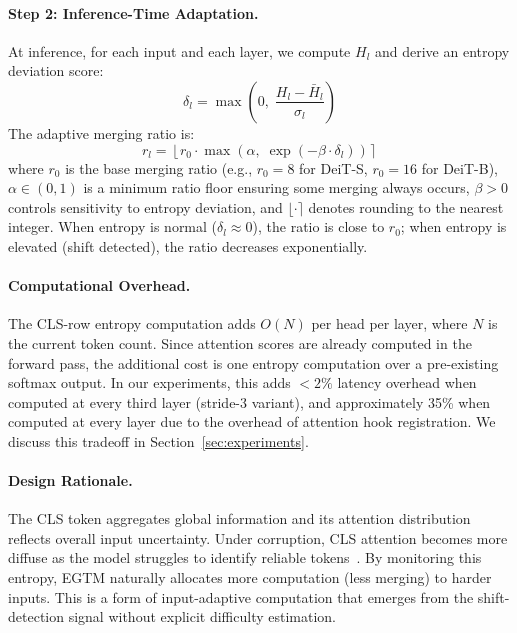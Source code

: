 \documentclass{article}
\newcommand{\ours}{EGTM}
\begin{document}
\paragraph{Step 2: Inference-Time Adaptation.}
At inference, for each input and each layer, we compute $H_l$ and derive an entropy deviation score:
\begin{equation}
\delta_l = \max\!\left(0,\; \frac{H_l - \bar{H}_l}{\sigma_l}\right)
\end{equation}
The adaptive merging ratio is:
\begin{equation}
r_l = \left\lfloor r_0 \cdot \max\!\left(\alpha,\; \exp(-\beta \cdot \delta_l)\right) \right\rceil
\label{eq:adaptive_ratio}
\end{equation}
where $r_0$ is the base merging ratio (e.g., $r_0{=}8$ for DeiT-S, $r_0{=}16$ for DeiT-B), $\alpha \in (0,1)$ is a minimum ratio floor ensuring some merging always occurs, $\beta > 0$ controls sensitivity to entropy deviation, and $\lfloor \cdot \rceil$ denotes rounding to the nearest integer. When entropy is normal ($\delta_l \approx 0$), the ratio is close to $r_0$; when entropy is elevated (shift detected), the ratio decreases exponentially.

\paragraph{Computational Overhead.}
The CLS-row entropy computation adds $O(N)$ per head per layer, where $N$ is the current token count. Since attention scores are already computed in the forward pass, the additional cost is one entropy computation over a pre-existing softmax output. In our experiments, this adds $<2\%$ latency overhead when computed at every third layer (stride-3 variant), and approximately 35\% when computed at every layer due to the overhead of attention hook registration. We discuss this tradeoff in Section~\ref{sec:experiments}.

\paragraph{Design Rationale.}
The CLS token aggregates global information and its attention distribution reflects overall input uncertainty. Under corruption, CLS attention becomes more diffuse as the model struggles to identify reliable tokens~\citep{guo2023robustifying}. By monitoring this entropy, \ours{} naturally allocates more computation (less merging) to harder inputs. This is a form of input-adaptive computation that emerges from the shift-detection signal without explicit difficulty estimation.
\end{document}

